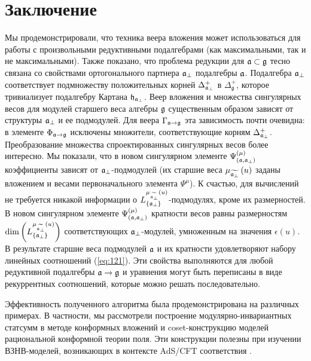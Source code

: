 \section{Заключение}
\label{sec:conclusion}

Мы продемонстрировали, что техника веера вложения может использоваться для работы с произвольными редуктивными подалгебрами (как максимальными, так и не максимальными). Также показано, что проблема редукции для  $\mathfrak{a} \subset \mathfrak{g}$ тесно связана со свойствами ортогонального партнера $ \mathfrak{a}_{\perp} $ подалгебры $\mathfrak{a}$. Подалгебра  $\mathfrak{a}_{\perp}$ соответствует подмножеству положительных корней $\Delta^{+}_{\mathfrak{a}_{\perp}}$ в $\Delta_{\mathfrak{g}}^{+}$, которое тривиализует подалгебру Картана $\mathfrak{h}_{\mathfrak{a}_{\perp}}$. Веер вложения и множества сингулярных весов для модулей старшего веса алгебры $\mathfrak{g}$ существенным образом зависят от структуры  $\mathfrak{a}_{\perp}$ и ее подмодулей.  Для веера  $\Gamma_{\mathfrak{a}\rightarrow \mathfrak{g}}$ эта зависимость почти очевидна: в элементе  $\Phi_{\mathfrak{a}\rightarrow \mathfrak{g}}$ исключены множители, соответствующие корням  $\Delta^{+}_{\mathfrak{a}_{\perp}}$. Преобразование множества спроектированных сингулярных весов более интересно. Мы показали, что в новом сингулярном элементе $\Psi ^{\left( \mu \right) }_{\left(  \mathfrak{a}, \mathfrak{a}_{\perp} \right)}$ коэффициенты зависят от $\mathfrak{a}_{\perp}$-подмодулей (их старшие веса $\mu _{\widetilde{\mathfrak{a}_{\perp}}}\left( u\right)$ заданы вложением и весами первоначального элемента $\Psi^{\mu}$). К счастью, для вычислений не требуется никакой информации о  $L^{\mu _{\widetilde{\mathfrak{a}_{\perp}}}\left( u\right)}_{\left\{ \mathfrak{a}_{\perp} \right\}}$-подмодулях, кроме их размерностей. В новом сингулярном элементе $\Psi ^{\left( \mu \right) }_{\left(  \mathfrak{a}, \mathfrak{a}_{\perp} \right)}$ кратности весов равны размерностям $\dim\left(L^{\mu _{\widetilde{\mathfrak{a}_{\perp}}}\left( u\right)}_{\left\{ \mathfrak{a}_{\perp} \right\}}\right)$ соответствующих  $\mathfrak{a}_{\perp}$-модулей, умноженным на значения $\epsilon (u)$. В результате старшие веса подмодулей $\mathfrak{a}$ и их кратности удовлетворяют набору линейных соотношений (\ref{eq:121}). Эти свойства выполняются для любой редуктивной подалгебры $\mathfrak{a}\rightarrow \mathfrak{g}$ и уравнения могут быть переписаны в виде рекуррентных соотношений, которые можно решать последовательно.

Эффективность полученного алгоритма была продемонстрирована на различных примерах. В частности, мы рассмотрели построение модулярно-инвариантных статсумм в методе конформных вложений и coset-конструкцию моделей рациональной конформной теории поля. Эти конструкции полезны при изучении ВЗНВ-моделей, возникающих в контексте AdS/CFT соответствия \cite{Maldacena:2000hw,Maldacena:2000kv,Maldacena:2001km}.

